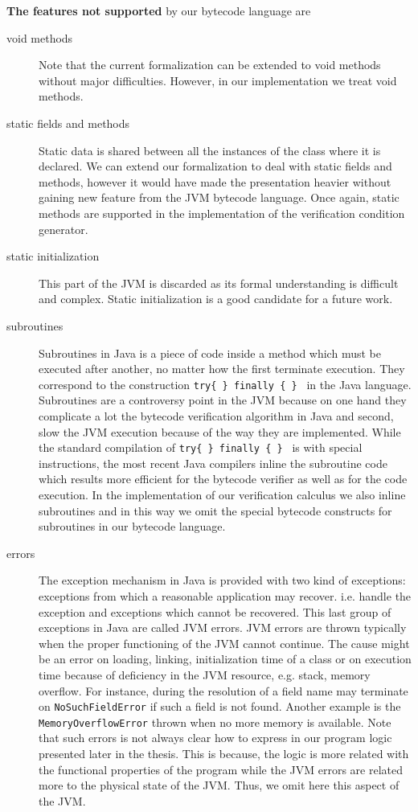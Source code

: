 \textbf{The features not supported} by our bytecode language are 
\begin{description} 
   \item[void methods]  Note that the current formalization can be extended to void methods without major difficulties.
         However, in our implementation 
         we treat void methods.

   \item [static fields and methods] Static data is shared between all the instances of the class
         where it is declared.  We can extend our formalization to deal with static fields and methods,
	 however it would have made the presentation heavier without gaining new feature from the JVM bytecode language. 
	 Once again, static methods are supported in the implementation of the verification condition generator.

   \item [static initialization] This part of the JVM is discarded as its formal understanding is difficult and complex.
         Static initialization is a good candidate for a future work. 

   \item [subroutines] Subroutines in Java is a piece of code inside a method which must be executed 
         after another, no matter how the first terminate execution. 
	 They correspond to the construction \texttt{try\{ \} finally \{ \} } in the Java language.
	 Subroutines are a controversy point 
	 in the JVM because on one hand they complicate a lot the bytecode verification algorithm in Java and second,
	 slow the JVM execution because of the way they are implemented. While the standard compilation of  \texttt{try\{ \} finally \{ \} }
	 is with special instructions, the most recent Java compilers inline the subroutine 
	 code which results more efficient for the bytecode verifier as well as for the code execution. 
	 In the implementation of our verification calculus we also inline subroutines and in this way we omit the special bytecode constructs
	 for subroutines in our bytecode language. 
	
  
  \item [errors] The exception mechanism in Java is provided with two kind of exceptions: exceptions from which 
        a reasonable application may recover. i.e. handle the exception and exceptions which cannot be recovered. This last group
	of exceptions in Java are called JVM errors. JVM errors are  thrown typically when the proper functioning of the JVM cannot 
	continue. 
	The cause might be an error  on loading, linking, initialization time of a class or on execution time because of deficiency in the JVM resource, e.g.
	stack, memory overflow.
	For instance, during the resolution of a field name may terminate on \texttt{NoSuchFieldError} if 
	such a field is not found. Another example is the \texttt{MemoryOverflowError} thrown when no more memory is available.
	Note that such errors is not always clear how to express in our program logic presented later in the thesis. This is because, 
	the logic is more related with the functional properties of the program while the JVM errors are related more to the physical
	state of the JVM. Thus, we omit here this aspect of the JVM.
	 


\end{description}
